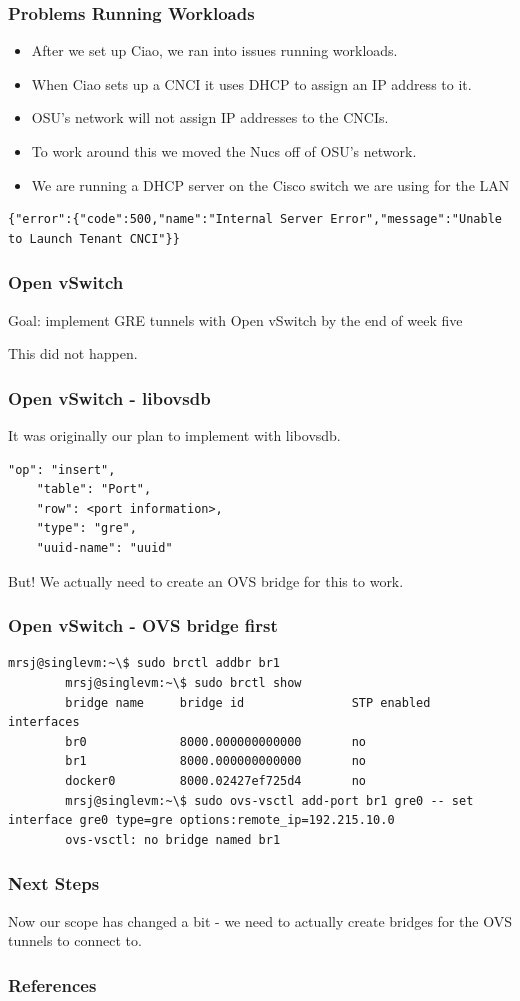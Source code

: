 \documentclass[pdf]{beamer}
\begin{document}
\begin{frame}[fragile]
	\frametitle{Problems Running Workloads}
	\begin{itemize}
		\item After we set up Ciao, we ran into issues running workloads.
		\item When Ciao sets up a CNCI it uses DHCP to assign an IP address to it.
		\item OSU's network will not assign IP addresses to the CNCIs.
		\item To work around this we moved the Nucs off of OSU's network.
		\item We are running a DHCP server on the Cisco switch we are using for the LAN
	\end{itemize}

	\begin{lstlisting}[caption=CNCI error]
{"error":{"code":500,"name":"Internal Server Error","message":"Unable to Launch Tenant CNCI"}}
	\end{lstlisting}
\end{frame}

\begin{frame}
	\frametitle{Open vSwitch}
	Goal: implement GRE tunnels with Open vSwitch by the end of week five

	This did not happen.
\end{frame}

\begin{frame}
	\frametitle{Open vSwitch - libovsdb}
	It was originally our plan to implement with libovsdb.

	\begin{lstlisting}[caption=libovsdb insert operation]
	"op": "insert",
	"table": "Port",
	"row": <port information>,
	"type": "gre",
	"uuid-name": "uuid"
	\end{lstlisting}

	But! We actually need to create an OVS bridge for this to work.

\end{frame}

\begin{frame}
	\frametitle{Open vSwitch - OVS bridge first}

	\begin{lstlisting}[caption=No Linux Bridge and OVS Tunnel]
		mrsj@singlevm:~\$ sudo brctl addbr br1
		mrsj@singlevm:~\$ sudo brctl show
		bridge name     bridge id               STP enabled     interfaces
		br0             8000.000000000000       no
		br1             8000.000000000000       no
		docker0         8000.02427ef725d4       no
		mrsj@singlevm:~\$ sudo ovs-vsctl add-port br1 gre0 -- set interface gre0 type=gre options:remote_ip=192.215.10.0
		ovs-vsctl: no bridge named br1
	\end{lstlisting}
\end{frame}

\begin{frame}
	\frametitle{Next Steps}
	Now our scope has changed a bit - we need to actually create bridges for
	the OVS tunnels to connect to.
\end{frame}

\begin{frame}
	\frametitle{References}
	
	
\end{frame}
\end{document}
